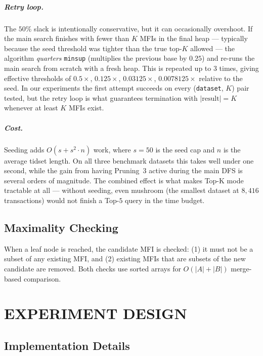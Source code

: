 \documentclass[12pt,a4paper]{report}
\begin{document}
  \paragraph{Retry loop.} The $50\%$ slack is intentionally conservative, but it can occasionally overshoot. If the main search finishes with fewer than $K$ MFIs in the final heap --- typically because the seed threshold was tighter than the true top-$K$ allowed --- the algorithm \emph{quarters} \texttt{minsup} (multiplies the previous base by $0.25$) and re-runs the main search from scratch with a fresh heap. This is repeated up to $3$ times, giving effective thresholds of $0.5\times$, $0.125\times$, $0.03125\times$, $0.0078125\times$ relative to the seed. In our experiments the first attempt succeeds on every (\texttt{dataset}, $K$) pair tested, but the retry loop is what guarantees termination with $|\text{result}| = K$ whenever at least $K$ MFIs exist.

  \paragraph{Cost.} Seeding adds $O(s + s^2 \cdot n)$ work, where $s = 50$ is the seed cap and $n$ is the average tidset length. On all three benchmark datasets this takes well under one second, while the gain from having Pruning~3 active during the main DFS is several orders of magnitude. The combined effect is what makes Top-K mode tractable at all --- without seeding, even mushroom (the smallest dataset at $8{,}416$ transactions) would not finish a Top-$5$ query in the time budget.

  \section{Maximality Checking}

  When a leaf node is reached, the candidate MFI is checked: (1) it must not be a subset of any existing MFI, and (2) existing MFIs that are subsets of the new candidate are removed. Both checks use sorted arrays for $O(|A| + |B|)$ merge-based comparison.

  \chapter{EXPERIMENT DESIGN}

  \section{Implementation Details}
\end{document}
